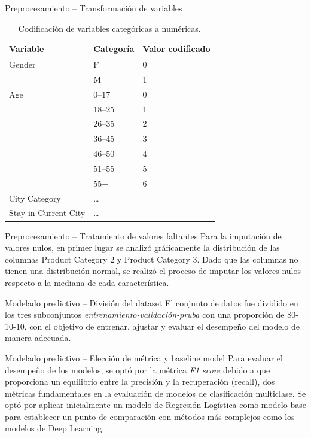 \documentclass{beamer}
\begin{document}
    \begin{frame}{Preprocesamiento -- Transformación de variables}
        \begin{table}[ht]
            \centering
            \caption{Codificación de variables categóricas a numéricas.}
            \begin{tabular}{l l l}
                \toprule
                \textbf{Variable} & \textbf{Categoría} & \textbf{Valor codificado} \\
                \midrule
                Gender & F & 0 \\
                    & M & 1 \\
                \midrule
                Age & 0--17 & 0 \\
                    & 18--25 & 1 \\
                    & 26--35 & 2 \\
                    & 36--45 & 3 \\
                    & 46--50 & 4 \\
                    & 51--55 & 5 \\
                    & 55+ & 6 \\
                \midrule
                City Category & \dots \\
                \midrule
                Stay in Current City & \dots \\
                \bottomrule
            \end{tabular}
            \label{tab:codificacion}
        \end{table}
    \end{frame}
    \begin{frame}{Preprocesamiento -- Tratamiento de valores faltantes}
        Para la imputación de valores nulos, en primer lugar se analizó gráficamente la 
        distribución de las columnas Product Category 2 y 
        Product Category 3. Dado que las columnas no tienen una distribución normal, se realizó
        el proceso de imputar los valores nulos respecto a la mediana de cada característica.
    \end{frame}
    \begin{frame}{Modelado predictivo -- División del dataset}
        El conjunto de datos fue dividido en los tres subconjuntos \textit{entrenamiento-validación-pruba} con una 
        proporción de 80-10-10, con el objetivo de entrenar,
        ajustar y evaluar el desempeño del modelo de manera adecuada.
    \end{frame}
    \begin{frame}{Modelado predictivo -- Elección de métrica y baseline model}
        Para evaluar el desempeño de los modelos, se optó por la métrica \textit{F1 score} debido a que 
        proporciona un equilibrio entre la precisión y la recuperación (recall), dos métricas fundamentales 
        en la evaluación de modelos de clasificación multiclase.
        \linebreak\linebreak
        Se optó por aplicar inicialmente un modelo de Regresión Logística como modelo base para establecer un punto
        de comparación con métodos más complejos como los modelos de Deep Learning.
    \end{frame}
\end{document}
